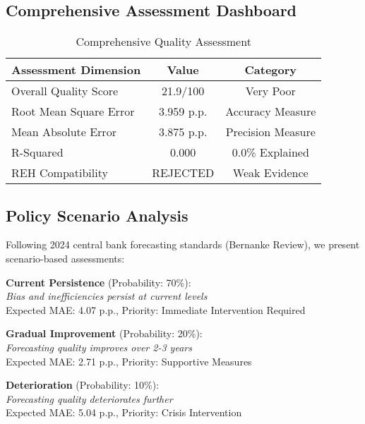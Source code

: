 \documentclass[11pt,a4paper]{article}
\begin{document}
\subsection{Comprehensive Assessment Dashboard}
\begin{table}[H]
    \centering
    \caption{Comprehensive Quality Assessment}
    \begin{tabular}{lcc}
        \toprule
        \textbf{Assessment Dimension} & \textbf{Value}                    & \textbf{Category} \\
        \midrule
        Overall Quality Score         & 21.9/100                          & Very Poor         \\
        Root Mean Square Error        & 3.959 p.p.                        & Accuracy Measure  \\
        Mean Absolute Error           & 3.875 p.p.                        & Precision Measure \\
        R-Squared                     & 0.000                             & 0.0\% Explained   \\
        REH Compatibility             & \textcolor{academicred}{REJECTED} & Weak Evidence     \\
        \bottomrule
    \end{tabular}
\end{table}

\subsection{Policy Scenario Analysis}
Following 2024 central bank forecasting standards (Bernanke Review), we present scenario-based assessments:

\textbf{Current Persistence} (Probability: 70\%):\\
\textit{Bias and inefficiencies persist at current levels}\\
Expected MAE: 4.07 p.p., Priority: Immediate Intervention Required

\textbf{Gradual Improvement} (Probability: 20\%):\\
\textit{Forecasting quality improves over 2-3 years}\\
Expected MAE: 2.71 p.p., Priority: Supportive Measures

\textbf{Deterioration} (Probability: 10\%):\\
\textit{Forecasting quality deteriorates further}\\
Expected MAE: 5.04 p.p., Priority: Crisis Intervention
\end{document}
